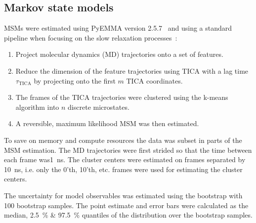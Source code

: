 \documentclass[journal=jacsat,manuscript=article]{achemso}
\begin{document}
\subsection{Markov state models}
MSMs were estimated using PyEMMA version 2.5.7~\cite{schererPyEMMASoftwarePackage2015a} and using a standard pipeline when focusing on the slow relaxation processes~\cite{noe_markov_2019, husic_markov_2018}: 
\begin{enumerate}
    \item Project molecular dynamics (MD) trajectories onto a set of features. 
    \item Reduce the dimension of the feature trajectories using TICA with a lag time $\tau_{\mathrm{TICA}}$ by projecting onto the first $m$ TICA coordinates. 
    \item The frames of the TICA trajectories were clustered using the k-means algorithm into $n$ discrete microstates. 
    \item A reversible, maximum likelihood MSM was then estimated. 
\end{enumerate}
To save on memory and compute resources the data was subset in parts of the MSM estimation. The MD trajectories were first strided so that the time between each frame was\SI{1}{\nano\second}. The cluster centers were estimated on frames separated by \SI{10} {\nano\second}, i.e. only the 0'th, 10'th, etc. frames were used for estimating the cluster centers. 

The uncertainty for model observables was estimated using the bootstrap with \num{100} bootstrap samples. The point estimate and error bars were calculated as the median,   \SI{2.5}{\percent} \& \SI{97.5}{\percent} quantiles of the distribution over the bootstrap samples.
\end{document}
